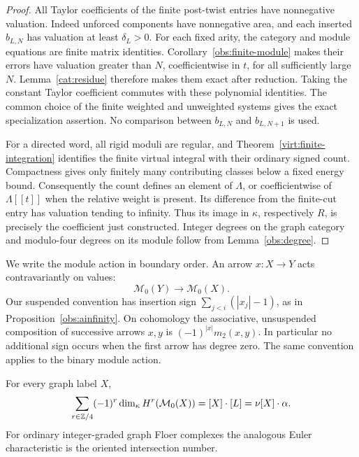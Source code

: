 \begin{proof}
All Taylor coefficients of the finite post-twist entries have
nonnegative valuation.  Indeed unforced components have nonnegative
area, and each inserted \(b_{L,N}\) has valuation at least
\(\delta_L>0\).  For each fixed arity, the category and module equations
are finite matrix identities.  Corollary~\ref{obs:finite-module}
makes their errors have valuation greater than \(N\), coefficientwise
in \(t\), for all sufficiently large \(N\).
Lemma~\ref{cat:residue} therefore makes them exact after reduction.
Taking the constant Taylor coefficient commutes with these polynomial
identities.  The common choice of the finite weighted and unweighted
systems gives the exact specialization assertion.  No comparison
between \(b_{L,N}\) and \(b_{L,N+1}\) is used.

For a directed word, all rigid moduli are regular, and
Theorem~\ref{virt:finite-integration} identifies the finite virtual
integral with their ordinary signed count.  Compactness gives only
finitely many contributing classes below a fixed energy bound.
Consequently the count defines an element of \(\Lambda\), or
coefficientwise of \(\Lambda[[t]]\) when the relative weight is present.
Its difference from the finite-cut entry has valuation tending to
infinity.  Thus its image in \(\kappa\), respectively \(R\), is precisely
the coefficient just constructed.  Integer degrees on the graph
category and modulo-four degrees on its module follow from
Lemma~\ref{obs:degree}.
\end{proof}

We write the module action in boundary order.  An arrow \(x:X\to Y\)
acts contravariantly on values:
\[
 \mathcal M_0(Y)\longrightarrow\mathcal M_0(X).
\]
Our suspended convention has insertion sign
\(\sum_{j<i}(|x_j|-1)\), as in Proposition~\ref{obs:ainfinity}.
On cohomology the associative, unsuspended composition of successive
arrows \(x,y\) is \((-1)^{|x|}m_2(x,y)\).
In particular no additional sign occurs when the first arrow has degree
zero.  The same convention applies to the binary module action.

\begin{lemma}\label{cat:euler}
For every graph label \(X\),
\begin{equation}\label{cat:euler-equation}
 \sum_{r\in\mathbb Z/4}(-1)^r
       \dim_\kappa H^r(\mathcal M_0(X))
   =[X]\cdot[L]=\nu[X]\cdot\alpha.
\end{equation}
For ordinary integer-graded graph Floer complexes the analogous Euler
characteristic is the oriented intersection number.
\end{lemma}

